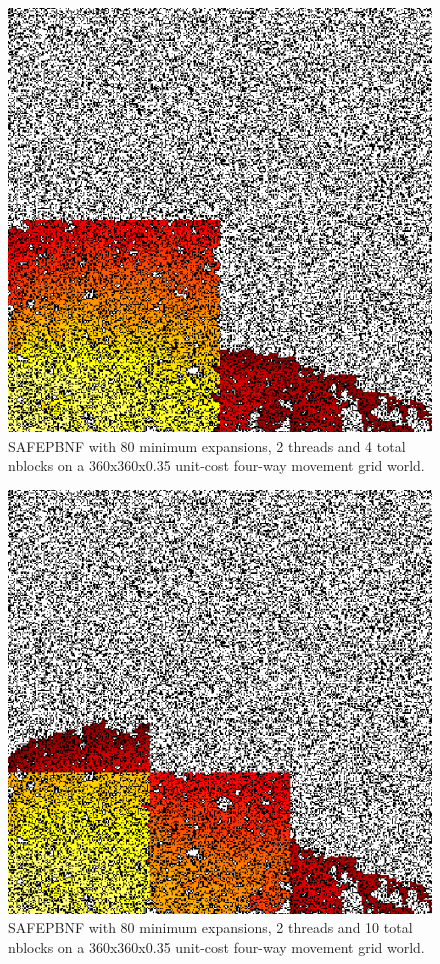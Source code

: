 \documentclass{article}
\begin{document}
\begin{figure}
\includegraphics{safepbnf-80min-2threads-4nblocks-unit-four-035-360-360}
\caption{SAFEPBNF with 80 minimum expansions, 2 threads and 4 total
  nblocks on a 360x360x0.35 unit-cost four-way movement grid world.}
\end{figure}

\begin{figure}
\includegraphics{safepbnf-80min-2threads-10nblocks-unit-four-035-360-360}
\caption{SAFEPBNF with 80 minimum expansions, 2 threads and 10 total
  nblocks on a 360x360x0.35 unit-cost four-way movement grid world.}
\end{figure}
\end{document}
